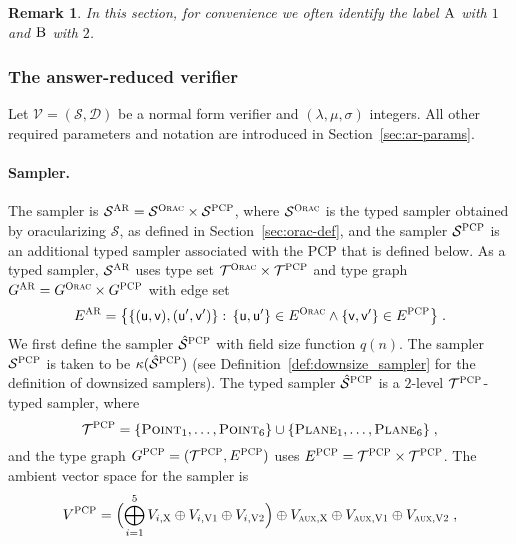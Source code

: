 \documentclass[11pt]{article}
\newtheorem{remark}[theorem]{Remark}
\theoremstyle{definition}
\newcommand{\downsize}{\kappa}
\newcommand{\sampler}{\mathcal{S}}
\newcommand{\decider}{\mathcal{D}}
\newcommand{\verifier}{\mathcal{V}}
\newcommand{\type}{\mathcal{T}}
\newcommand{\gamestyle}[1]{\ensuremath{\textsc{#1}}\xspace}
\newcommand{\ora}{\gamestyle{Orac}}
\newcommand{\pcp}{\gamestyle{PCP}}
\newcommand{\ar}{\gamestyle{AR}}
\newcommand{\labelstyle}[1]{\ensuremath{\textsc{#1}}\xspace}
\newcommand{\aux}{\labelstyle{aux}}
\newcommand{\xpt}{\labelstyle{X}}
\newcommand{\dir}[1]{\labelstyle{V#1}}
\newcommand{\tvarstyle}[1]{\mathsf{#1}}
\newcommand{\lvar}{\ensuremath{\tvarstyle{u}}}
\newcommand{\rvar}{\ensuremath{\tvarstyle{v}}}
\newcommand{\alice}{\labelstyle{A}}
\newcommand{\bob}{\labelstyle{B}}
\newcommand{\typestyle}[1]{\ensuremath{\textsc{#1}}\xspace}
\newcommand{\Plane}{\typestyle{Plane}}
\newcommand{\Point}{\typestyle{Point}}
\begin{document}
\begin{remark}\label{rk:ab-01}
  In this section, for convenience we often identify the label $\alice$ with $1$
  and $\bob$ with $2$.
\end{remark}

\subsubsection{The answer-reduced verifier}

Let $\verifier = (\sampler, \decider)$ be a normal form verifier and
$(\lambda,\mu,\sigma)$ integers.
All other required parameters and notation are introduced in
Section~\ref{sec:ar-params}.

\paragraph{Sampler.}
The sampler is $\sampler^\ar = \sampler^\ora \times \sampler^\pcp$, where
$\sampler^\ora$ is the typed sampler obtained by oracularizing $\sampler$, as
defined in Section~\ref{sec:orac-def}, and the sampler $\sampler^\pcp$ is an
additional typed sampler associated with the PCP that is defined below.
As a typed sampler, $\sampler^\ar$ uses type set $\type^\ora
\times \type^\pcp$ and type graph $G^\ar = G^\ora \times G^\pcp$ with edge set
\begin{equation*}
  E^\ar = \bigl\{\{(\lvar,\rvar),(\lvar',\rvar')\}:\,
  \{\lvar, \lvar'\} \in E^\ora \land \{\rvar, \rvar'\} \in
  E^\pcp \bigr\}\;.
\end{equation*}
We first define the sampler $\hat{\sampler}^\pcp$ with field size function
$q(n)$.
The sampler $\sampler^\pcp$ is taken to be $\downsize(\hat{\sampler}^\pcp)$ (see
Definition~\ref{def:downsize_sampler} for the definition of downsized samplers).
The typed sampler $\hat{\sampler}^\pcp$ is a $2$-level $\type^\pcp$-typed
sampler, where 
\begin{equation*}
  \type^\pcp = \{ \Point_1, \ldots,\Point_6\} \cup \{\Plane_1,
  \dots, \Plane_6\}\;,
\end{equation*}
and the type graph $G^\pcp=(\type^\pcp,E^\pcp)$ uses $E^\pcp = \type^\pcp \times
\type^\pcp$.
The ambient vector space for the sampler is
\begin{equation}
  \label{eq:V-pcp}
  V^\pcp = \Bigl( \bigoplus_{i=1}^{5} V_{i, \xpt} \oplus V_{i, \dir{1}} \oplus
  V_{i, \dir{2}} \Bigr) \oplus V_{\aux, \xpt} \oplus V_{\aux, \dir{1}} \oplus
  V_{\aux, \dir{2}}\;,
\end{equation}
\end{document}
